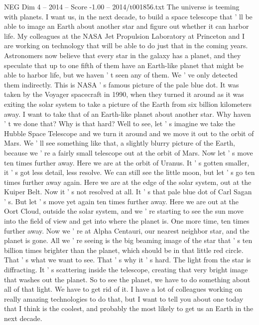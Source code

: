 \begin{textsample}{NEG Dim 4 – 2014 – Score -1.00 – 2014/t001856.txt}  \label{ex:f4_neg_016}
The universe is teeming with planets.
I want us, in the next decade, to build a space telescope that ' ll be able to image an Earth about another star and figure out whether it can harbor life.
My colleagues at the NASA Jet Propulsion Laboratory at Princeton and I are working on technology that will be able to do just that in the coming years.
Astronomers now believe that every star in the galaxy has a planet, and they speculate that up to one fifth of them have an Earth-like planet that might be able to harbor life, but we haven ' t seen any of them.
We ' ve only detected them indirectly.
This is NASA ' s famous picture of the pale blue dot.
It was taken by the Voyager spacecraft in 1990, when they turned it around as it was exiting the solar system to take a picture of the Earth from six billion kilometers away.
I want to take that of an Earth-like planet about another star.
Why haven ' t we done that?
Why is that hard?
Well to see, let ' s imagine we take the Hubble Space Telescope and we turn it around and we move it out to the orbit of Mars.
We ' ll see something like that, a slightly blurry picture of the Earth, because we ' re a fairly small telescope out at the orbit of Mars.
Now let ' s move ten times further away.
Here we are at the orbit of Uranus.
It ' s gotten smaller, it ' s got less detail, less resolve.
We can still see the little moon, but let ' s go ten times further away again.
Here we are at the edge of the solar system, out at the Kuiper Belt.
Now it ' s not resolved at all.
It ' s that pale blue dot of Carl Sagan ' s.
But let ' s move yet again ten times further away.
Here we are out at the Oort Cloud, outside the solar system, and we ' re starting to see the sun move into the field of view and get into where the planet is.
One more time, ten times further away.
Now we ' re at Alpha Centauri, our nearest neighbor star, and the planet is gone.
All we ' re seeing is the big beaming image of the star that ' s ten billion times brighter than the planet, which should be in that little red circle.
That ' s what we want to see.
That ' s why it ' s hard.
The light from the star is diffracting.
It ' s scattering inside the telescope, creating that very bright image that washes out the planet.
So to see the planet, we have to do something about all of that light.
We have to get rid of it.
I have a lot of colleagues working on really amazing technologies to do that, but I want to tell you about one today that I think is the coolest, and probably the most likely to get us an Earth in the next decade.

\end{textsample}
